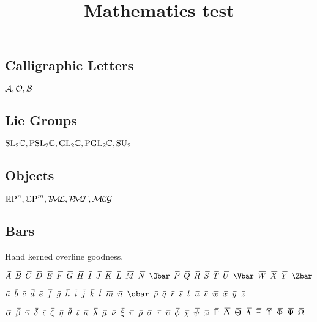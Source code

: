 \documentclass[noaddress, tikzl]{nmd/article}
\title{Mathematics test}
\begin{document}
\maketitle

\subsection*{Calligraphic Letters}  ${\mathcal A}, {\mathcal O}, {\mathcal B}$

\subsection*{Lie Groups}  $\mathrm{ SL}_{2} {\mathbb C}, \mathrm{PSL}_{2} {\mathbb C}, \mathrm{GL}_{2} {\mathbb C},
\mathrm{PGL}_{2} {\mathbb C}, \mathrm{SU}_2$

\subsection*{Objects} $\RP^n, \CP^m, \PML, \PMF, \MCG$

\subsection*{Bars} Hand kerned overline goodness.  

$\Abar \enskip \Bbar \enskip \Cbar \enskip \Dbar
\enskip \Ebar \enskip \Fbar \enskip \Gbar \enskip \Hbar \enskip \Ibar
\enskip \Jbar \enskip \Kbar \enskip \Lbar \enskip \Mbar \enskip \Nbar
\enskip \Obar \enskip \Pbar \enskip \Qbar \enskip \Rbar \enskip \Sbar
\enskip \Tbar \enskip \Ubar \enskip \Vbar \enskip \Wbar \enskip \Xbar
\enskip \Ybar \enskip \Zbar$

$\abar \enskip \bbar \enskip \cbar \enskip \dbar \enskip \ebar \enskip
\fbar \enskip \gbar \enskip \hhbar \enskip \ibar \enskip \jbar \enskip \kbar
\enskip \lbar \enskip \mbar \enskip \nbar \enskip \obar \enskip \pbar
\enskip \qbar \enskip \rbar \enskip \sbar \enskip \tbar \enskip \ubar
\enskip \vbar \enskip \wbar \enskip \xbar \enskip \ybar \enskip \zbar$

$\alphabar \enskip \betabar \enskip \gammabar \enskip \deltabar \enskip \epsilonbar \enskip \zetabar \enskip \etabar \enskip \thetabar \enskip \iotabar \enskip \kappabar \enskip \lambdabar \enskip \mubar \enskip \nubar \enskip \xibar \enskip \pibar \enskip \rhobar \enskip \sigmabar \enskip \taubar \enskip \upsilonbar \enskip \phibar \enskip \chibar \enskip \psibar \enskip \omegabar \enskip \Gammabar \enskip \Deltabar \enskip \Thetabar \enskip \Lambdabar \enskip \Xibar \enskip \Upsilonbar \enskip \Phibar \enskip \Psibar \enskip \Omegabar$
\end{document}
